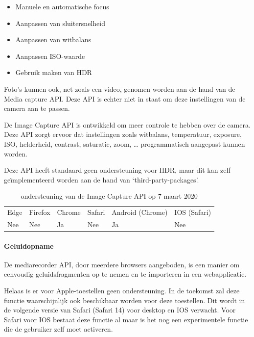  \begin{itemize}
     \item Manuele en automatische focus
     \item Aanpassen van sluitersnelheid
     \item Aanpassen van witbalans
     \item Aanpassen ISO-waarde
     \item Gebruik maken van HDR 
   \end{itemize}

Foto's kunnen ook, net zoals een video, genomen worden aan de hand van de Media capture API. Deze API is echter niet in staat om deze instellingen van de camera aan te passen.

De Image Capture API \autocite{Mandyam2017} is ontwikkeld om meer controle te hebben over de camera. Deze API zorgt ervoor dat instellingen zoals witbalans, temperatuur, exposure, ISO, helderheid, contrast, saturatie, zoom, … programmatisch aangepast kunnen worden.

Deze API heeft standaard geen ondersteuning voor HDR, maar dit kan zelf geïmplementeerd worden aan de hand van ‘third-party-packages’.

\autocite{Bhaumik2019}

\begin{table}[H]
	\centering
	\begin{tabular}{llllll}
		Edge & Firefox & Chrome & Safari & Android (Chrome) & IOS (Safari) \\
		Nee   & Nee      & Ja     & Nee     & Ja               & Nee          
	\end{tabular}	
	\caption{ondersteuning van de Image Capture API op 7 maart 2020}
\end{table}



\paragraph{Geluidopname }



De mediarecorder API, \autocite{CasasSanchez2017} door meerdere browsers aangeboden, is een manier om eenvoudig geluidsfragmenten op te nemen en te importeren in een webapplicatie.

Helaas is er voor Apple-toestellen geen ondersteuning. In de toekomst zal deze functie waarschijnlijk ook beschikbaar worden voor deze toestellen. Dit wordt in de volgende versie van Safari (Safari 14) voor desktop en IOS verwacht. Voor Safari voor IOS bestaat deze functie al maar is het nog een experimentele functie die de gebruiker zelf moet activeren.



